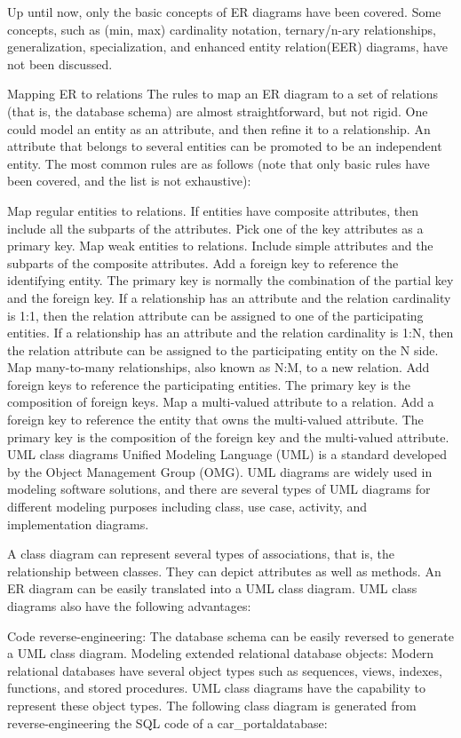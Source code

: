 \documentclass[]{book}
\begin{document}
Up until now, only the basic concepts of ER diagrams have been covered. Some concepts, such as (min, max) cardinality notation, ternary/n-ary relationships, generalization, specialization, and enhanced entity relation(EER) diagrams, have not been discussed.

Mapping ER to relations
The rules to map an ER diagram to a set of relations (that is, the database schema) are almost straightforward, but not rigid. One could model an entity as an attribute, and then refine it to a relationship. An attribute that belongs to several entities can be promoted to be an independent entity. The most common rules are as follows (note that only basic rules have been covered, and the list is not exhaustive):

Map regular entities to relations. If entities have composite attributes, then include all the subparts of the attributes. Pick one of the key attributes as a primary key.
Map weak entities to relations. Include simple attributes and the subparts of the composite attributes. Add a foreign key to reference the identifying entity. The primary key is normally the combination of the partial key and the foreign key.
If a relationship has an attribute and the relation cardinality is 1:1, then the relation attribute can be assigned to one of the participating entities.
If a relationship has an attribute and the relation cardinality is 1:N, then the relation attribute can be assigned to the participating entity on the N side.
Map many-to-many relationships, also known as N:M, to a new relation. Add foreign keys to reference the participating entities. The primary key is the composition of foreign keys.
Map a multi-valued attribute to a relation. Add a foreign key to reference the entity that owns the multi-valued attribute. The primary key is the composition of the foreign key and the multi-valued attribute.
UML class diagrams
Unified Modeling Language (UML) is a standard developed by the Object Management Group (OMG). UML diagrams are widely used in modeling software solutions, and there are several types of UML diagrams for different modeling purposes including class, use case, activity, and implementation diagrams.

A class diagram can represent several types of associations, that is, the relationship between classes. They can depict attributes as well as methods. An ER diagram can be easily translated into a UML class diagram. UML class diagrams also have the following advantages:

Code reverse-engineering: The database schema can be easily reversed to generate a UML class diagram.
Modeling extended relational database objects: Modern relational databases have several object types such as sequences, views, indexes, functions, and stored procedures. UML class diagrams have the capability to represent these object types.
The following class diagram is generated from reverse-engineering the SQL code of a car\_portaldatabase:
\end{document}
